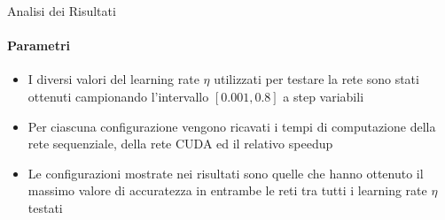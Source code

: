\documentclass[
 ]{beamer}
\begin{document}
\begin{frame}{Analisi dei Risultati}
    \framesubtitle{Parametri}
    \smallskip
    \begin{itemize} [<+->]
        \setlength\itemsep{2.5em}
        \item \large I diversi valori del learning rate $\eta$ utilizzati per testare la rete sono stati ottenuti campionando l'intervallo $[0.001, 0.8]$ a step variabili
        \item \large Per ciascuna configurazione vengono ricavati i tempi di computazione della rete sequenziale, della rete CUDA ed il relativo speedup
        \item \large Le configurazioni mostrate nei risultati sono quelle che hanno ottenuto il massimo valore di accuratezza in entrambe le reti tra tutti i learning rate $\eta$ testati
    \end{itemize}     
\end{frame}
\end{document}
